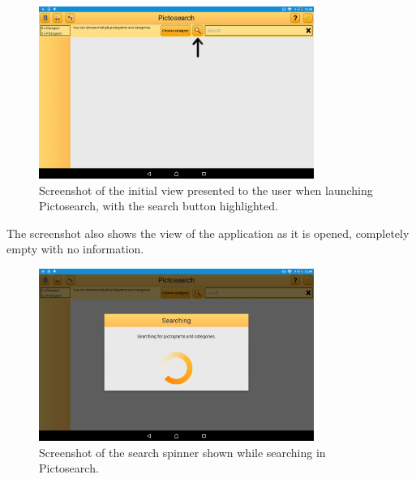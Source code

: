 \begin{figure}[htb]
    \centering
    \includegraphics[width=0.8\textwidth]{figures/img/screenshots/old_startup.png}
    \caption{Screenshot of the initial view presented to the user when launching Pictosearch, with the search button highlighted.}\label{fig:screenshot_startup}
\end{figure}
\noindent
The screenshot also shows the view of the application as it is opened, completely empty with no information.

\begin{figure}[htb]
    \centering
    \includegraphics[width=0.8\textwidth]{figures/img/screenshots/old_dialog.png}
    \caption{Screenshot of the search spinner shown while searching in Pictosearch.}\label{fig:screenshot_searchspinner}
\end{figure}

